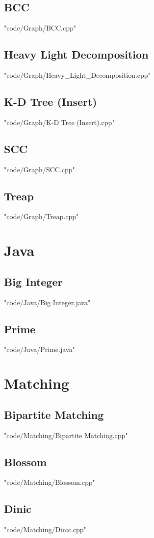 \documentclass [landscape,8pt,a4paper,twocolumn]{article}
\begin{document}
\subsection{BCC}
 {"code/Graph/BCC.cpp"}
\subsection{Heavy Light Decomposition}
 {"code/Graph/Heavy_Light_Decomposition.cpp"}
\subsection{K-D Tree (Insert)}
 {"code/Graph/K-D Tree (Insert).cpp"}
\subsection{SCC}
 {"code/Graph/SCC.cpp"}
\subsection{Treap}
 {"code/Graph/Treap.cpp"}
\section{Java}
\subsection{Big Integer}
 {"code/Java/Big Integer.java"}
\subsection{Prime}
 {"code/Java/Prime.java"}
\section{Matching}
\subsection{Bipartite Matching}
 {"code/Matching/Bipartite Matching.cpp"}
\subsection{Blossom}
 {"code/Matching/Blossom.cpp"}
\subsection{Dinic}
 {"code/Matching/Dinic.cpp"}
\end{document}

